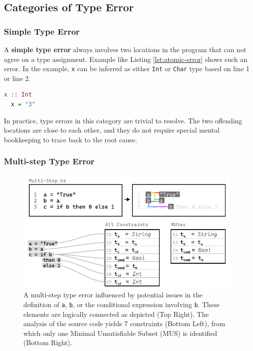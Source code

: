\documentclass[pdflatex,lineno,sn-nature,Numbered]{sn-jnl}%
\begin{document}
\subsection{Categories of Type Error} \label{sec:categories}


\subsubsection*{Simple Type Error}
A \textbf{simple type error} always involves two locations in the program that can not agree on a type assignment. Example like Listing \ref{lst:atomic-error} shows such an error. In the example, {\tt x} can be inferred as either {\tt Int} or {\tt Char} type based on line 1 or line 2. 

\begin{lstlisting}[language=Haskell, caption=An example of a simple type error, label={lst:atomic-error}]
  x :: Int
  x = "3"
\end{lstlisting}

In practice, type errors in this category are trivial to resolve. The two offending locations are close to each other, and they do not require special mental bookkeeping to trace back to the root cause. 

\subsubsection*{Multi-step Type Error}

\begin{figure}[hbt]
  \centering \includegraphics[width=\linewidth]{images/Multi-Step-MUS}
  \caption {A multi-step type error influenced by potential issues in the definition of \texttt{a}, \texttt{b}, or the conditional expression involving \texttt{b}. These elements are logically connected as depicted (Top Right). The analysis of the source code yields 7 constraints (Bottom Left), from which only one Minimal Unsatisfiable Subset (MUS) is identified (Bottom Right).
  }
  \label{fig:multi-step-2}
  \end{figure}
\end{document}

